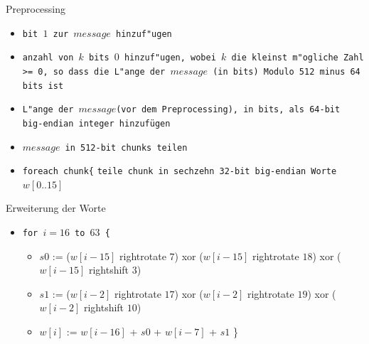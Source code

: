 \documentclass[xcolor=x11names,compress]{beamer}
\renewcommand{\(}{\begin{columns}}
\renewcommand{\)}{\end{columns}}
\newcommand{\<}[1]{\begin{column}{#1}}
\renewcommand{\>}{\end{column}}
\begin{document}
\begin{frame}{Preprocessing}
\begin{itemize}
\item \texttt{bit $1$ zur $message$ hinzuf"ugen} \pause
\item \texttt{anzahl von $k$ bits $0$ hinzuf"ugen, wobei $k$ die kleinst m"ogliche Zahl >= 0, so dass die L"ange der $message$ (in bits) Modulo 512 minus 64 bits ist} \pause
\item \texttt{L"ange der $message$(vor dem Preprocessing), in bits, als 64-bit big-endian integer hinzufügen}\newline \newline \pause
\item \texttt{$message$ in 512-bit chunks teilen}
\item \texttt{foreach chunk\{}\newline
    \texttt{teile chunk in sechzehn 32-bit big-endian Worte $w[0..15]$}
\end{itemize}




\end{frame}

\begin{frame}{Erweiterung der Worte}

\begin{itemize}

\item[]
\texttt{for $i=16$ to $63$ \{}
		 \begin{itemize}
		 \item[] $s0$ := ($w[i-15]$ rightrotate $7$) xor ($w[i-15]$ rightrotate $18$) xor ($w[i-15]$ rightshift $3$) \newline
        \item[] $s1$ := ($w[i-2]$ rightrotate $17$) xor ($w[i-2]$ rightrotate $19$) xor ($w[i-2]$ rightshift $10$) \newline
        \item[] $w[i]$ := $w[i-16]$ + $s0$ + $w[i-7]$ + $s1$ \newline \}
		 \end{itemize}
         
\end{itemize}


\end{frame}
\end{document}
